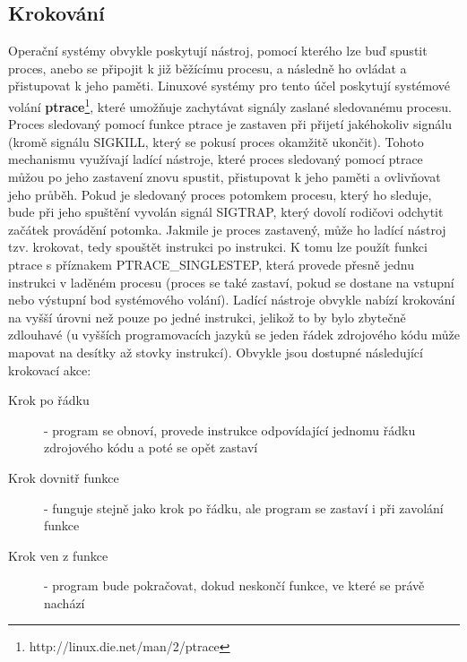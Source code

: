 \documentclass[bc,male,python,dept460]{diploma}						%
\begin{document}
	\subsection{Krokování}
		Operační systémy obvykle poskytují nástroj, pomocí kterého lze buď spustit proces, anebo se připojit k již běžícímu procesu, a následně ho ovládat
		a přistupovat k jeho paměti. Linuxové systémy pro tento účel poskytují systémové volání \textbf{ptrace}\footnote{http://linux.die.net/man/2/ptrace},
		které umožňuje zachytávat signály zaslané sledovanému procesu. Proces sledovaný pomocí funkce ptrace je zastaven při přijetí jakéhokoliv signálu
		(kromě signálu SIGKILL, který se pokusí proces okamžitě ukončit). Tohoto mechanismu využívají ladící nástroje, které proces sledovaný pomocí
		ptrace můžou po jeho zastavení znovu spustit, přistupovat k jeho paměti a ovlivňovat jeho průběh. Pokud je sledovaný proces potomkem procesu,
		který ho sleduje, bude při jeho spuštění vyvolán signál SIGTRAP, který dovolí rodičovi odchytit začátek provádění potomka. Jakmile je proces
		zastavený, může ho ladící nástroj tzv. krokovat, tedy spouštět instrukci po instrukci. K tomu lze použít funkci ptrace s příznakem PTRACE\_SINGLESTEP,
		která provede přesně jednu instrukci v laděném procesu (proces se také zastaví, pokud se dostane na vstupní nebo výstupní bod systémového volání).
		Ladící nástroje obvykle nabízí krokování na vyšší úrovni než pouze po jedné instrukci, jelikož to by bylo zbytečně zdlouhavé (u vyšších programovacích
		jazyků se jeden řádek zdrojového kódu může mapovat na desítky až stovky instrukcí). Obvykle jsou dostupné následující krokovací akce:
		\begin{description}
			\item[Krok po řádku] - program se obnoví, provede instrukce odpovídající jednomu řádku zdrojového kódu a poté se opět zastaví
			\item[Krok dovnitř funkce] - funguje stejně jako krok po řádku, ale program se zastaví i při zavolání funkce
			\item[Krok ven z funkce] - program bude pokračovat, dokud neskončí funkce, ve které se právě nachází
		\end{description}
		
\end{document}
